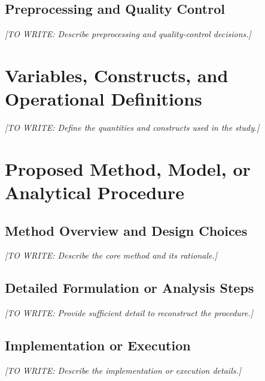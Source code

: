 \documentclass[12pt,a4paper,oneside]{report}
\newif\ifshowguidance
\newcommand{\Guide}[1]{%
  \ifshowguidance
  \begin{tcolorbox}[enhanced,breakable,colback=GuideBlue,
    colframe=GuideBorder,boxrule=0.5pt,arc=1mm,
    title={Writing guide --- replace with your research},
    colbacktitle=ThesisBlue,coltitle=white,fonttitle=\small\bfseries,
    before skip=10pt,after skip=10pt]
    \small #1
  \end{tcolorbox}
  \fi}
\newcommand{\Draft}[1]{\par\noindent\textit{[TO WRITE: #1]}\par}
\begin{document}
\subsection{Preprocessing and Quality Control}
\Guide{Document cleaning, normalization, missing-data handling, outlier
rules, filtering, transformations, and quality checks. Explain their order
and rationale. If learning from data, fit preprocessing only on training
data when required to prevent information leakage.}
\Draft{Describe preprocessing and quality-control decisions.}

\section{Variables, Constructs, and Operational Definitions}
\Guide{Define inputs, outcomes, predictors, controls, confounders, units,
scales, and measurement procedures as relevant. For qualitative research,
explain analytical concepts and how they guide attention without forcing
the data into unsupported categories.}
\Draft{Define the quantities and constructs used in the study.}

\section{Proposed Method, Model, or Analytical Procedure}
\subsection{Method Overview and Design Choices}
\Guide{Describe the method precisely and explain what is adopted, modified,
or original. Provide citations for existing methods. Justify important
choices by the question, constraints, and evidence.}
\Draft{Describe the core method and its rationale.}
\subsection{Detailed Formulation or Analysis Steps}
\Guide{Supply equations, algorithms, procedures, interview/coding protocols,
or proof strategy as applicable. Define objective functions, parameters,
constraints, update rules, and stopping criteria where relevant. Clarify
the relationship between components in coupled or multistage methods.}
\Draft{Provide sufficient detail to reconstruct the procedure.}
\subsection{Implementation or Execution}
\Guide{Record software and version numbers, libraries, hardware,
instrument settings, precision, seeds, solver tolerances, training settings,
and execution time as relevant. For qualitative work, record collection
procedures, researcher roles, coding process, and changes to the codebook.
Separate essential methodology from incidental code listings.}
\Draft{Describe the implementation or execution details.}
\end{document}
